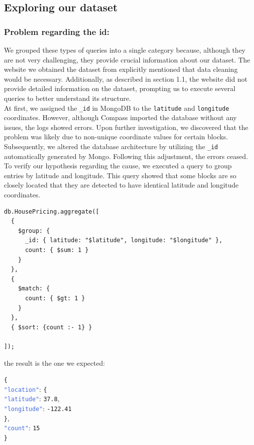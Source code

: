 \documentclass{Configuration_Files/PoliMi3i_thesis}
\newcommand{\jsonkey}[1]{\textcolor{RoyalBlue}{\texttt{"#1"}}}
\newcommand{\jsonnumber}[1]{\textcolor{BrickRed}{\texttt{#1}}}
\begin{document}
\subsection{Exploring our dataset}
\subsubsection*{Problem regarding the id:}
We grouped these types of queries into a single category because, although they are not very challenging, they provide crucial information about our dataset. The website we obtained the dataset from explicitly mentioned that data cleaning would be necessary. Additionally, as described in section 1.1, the website did not provide detailed information on the dataset, prompting us to execute several queries to better understand its structure.\\
At first, we assigned the \texttt{\_id} in MongoDB to the \texttt{latitude} and \texttt{longitude} coordinates. However, although Compass imported the database without any issues, the logs showed errors. Upon further investigation, we discovered that the problem was likely due to non-unique coordinate values for certain blocks. Subsequently, we altered the database architecture by utilizing the \texttt{\_id} automatically generated by Mongo. Following this adjustment, the errors ceased. To verify our hypothesis regarding the cause, we executed a query to group entries by latitude and longitude. This query showed that some blocks are so closely located that they are detected to have identical latitude and longitude coordinates.

\begin{lstlisting}[language=MongoDB]
db.HousePricing.aggregate([
  {
    $group: {
      _id: { latitude: "$latitude", longitude: "$longitude" },
      count: { $sum: 1 }
    }
  },
  {
    $match: {
      count: { $gt: 1 }
    }
  }, 
  { $sort: {count :- 1} }

]);

\end{lstlisting}

the result is the one we expected:

\noindent
\texttt{\{} \\
\jsonkey{location}: \texttt{\{} \\
\hspace*{1em} \jsonkey{latitude}: \jsonnumber{37.8}, \\
\hspace*{1em} \jsonkey{longitude}: \jsonnumber{-122.41} \\
\texttt{\}}, \\
\jsonkey{count}: \jsonnumber{15} \\
\texttt{\}} \\
\end{document}
